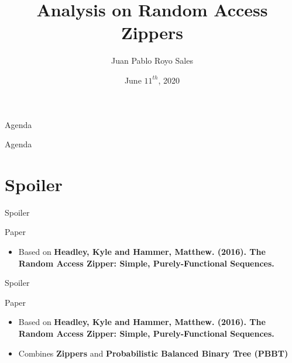 \documentclass{beamer}
\title{Analysis on Random Access Zippers}
\author{Juan Pablo Royo Sales}
\institute{Universitat Politècnica de Catalunya}
\date{June $11^{th}$, 2020}
\begin{document}
\begin{frame}
\titlepage
\end{frame}

\begin{frame}{Agenda}
  \tableofcontents
\end{frame}

\begin{frame}{Agenda}
  \section{Spoiler}
  \tableofcontents[currentsection]
\end{frame}

\begin{frame}[fragile]{Spoiler}

  \begin{block}{Paper}
    \begin{itemize}
      \item Based on \textbf{Headley, Kyle and Hammer, Matthew. (2016). The Random Access Zipper: Simple, Purely-Functional Sequences.}
    \end{itemize}
  \end{block}

\end{frame}

\begin{frame}[fragile]{Spoiler}

  \begin{block}{Paper}
    \begin{itemize}
      \item Based on \textbf{Headley, Kyle and Hammer, Matthew. (2016). The Random Access Zipper: Simple, Purely-Functional Sequences.}
      \item Combines \textbf{Zippers} and \textbf{Probabilistic Balanced Binary Tree (PBBT)}
    \end{itemize}
  \end{block}

\end{frame}
\end{document}
